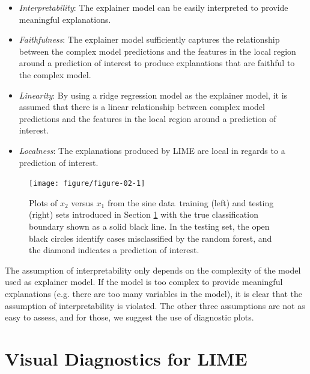 \documentclass[AMS,STIX2COL]{WileyNJD-v2}\usepackage[]{graphicx}\usepackage[]{color}
\newenvironment{knitrout}{}{} %
\newcommand{\data}{sine data}
\begin{document}
\begin{itemize}
\item \emph{Interpretability}: The explainer model can be easily interpreted to provide meaningful explanations.
\item \emph{Faithfulness}: The explainer model sufficiently captures the relationship between the complex model predictions and the features in the local region around a prediction of interest to produce explanations that are faithful to the complex model.
\item \emph{Linearity}: By using a ridge regression model as the explainer model, it is assumed that there is a linear relationship between complex model predictions and the features in the local region around a prediction of interest.
\item \emph{Localness}: The explanations produced by LIME are local in regards to a prediction of interest.
\end{itemize}



\begin{figure}[!thp]
\centering
\begin{knitrout}
\color{fgcolor}

{\centering \texttt{[image: figure/figure-02-1]} 

}



\end{knitrout}
\caption{Plots of $x_2$ versus $x_1$ from the \data \ training (left) and testing (right) sets introduced in Section \ref{diagnostics} with the true classification boundary shown as a solid black line. In the testing set, the open black circles identify cases misclassified by the random forest, and the diamond indicates a prediction of interest.}
\label{fig:figure-02}
\end{figure}

The assumption of interpretability only depends on the complexity of the model used as explainer model. If the model is too complex to provide meaningful explanations (e.g. there are too many variables in the model), it is clear that the assumption of interpretability is violated. The other three assumptions are not as easy to assess, and for those, we suggest the use of diagnostic plots.

\section{Visual Diagnostics for LIME} \label{diagnostics}
\end{document}
